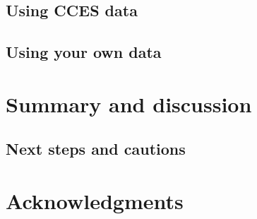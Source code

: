 \documentclass[
]{jss}
\begin{document}
\subsection*{Using CCES data}

\subsection*{Using your own data}

\section{Summary and discussion} \label{sec:summary}

\subsection*{Next steps and cautions}

\section*{Acknowledgments}


\end{document}
